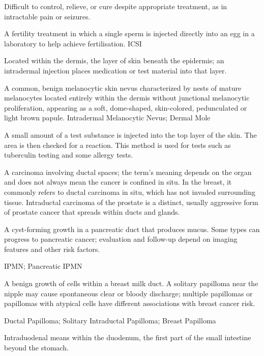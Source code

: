  Difficult to control, relieve, or cure despite appropriate treatment, as in intractable pain or seizures.

 A fertility treatment in which a single sperm is injected directly into an egg in a laboratory to help achieve fertilisation.
\synonyms
ICSI

 Located within the dermis, the layer of skin beneath the epidermis; an intradermal injection places medication or test material into that layer.

 A common, benign melanocytic skin nevus characterized by nests of mature melanocytes located entirely within the dermis without junctional melanocytic proliferation, appearing as a soft, dome-shaped, skin-colored, pedunculated or light brown papule.
\synonyms
Intradermal Melanocytic Nevus; Dermal Mole

 A small amount of a test substance is injected into the top layer of the skin. The area is then checked for a reaction. This method is used for tests such as tuberculin testing and some allergy tests.

 A carcinoma involving ductal spaces; the term’s meaning depends on the organ and does not always mean the cancer is confined in situ. In the breast, it commonly refers to ductal carcinoma in situ, which has not invaded surrounding tissue. Intraductal carcinoma of the prostate is a distinct, usually aggressive form of prostate cancer that spreads within ducts and glands.

 A cyst-forming growth in a pancreatic duct that produces mucus. Some types can progress to pancreatic cancer; evaluation and follow-up depend on imaging features and other risk factors.

\synonyms
IPMN; Pancreatic IPMN

 A benign growth of cells within a breast milk duct. A solitary papilloma near the nipple may cause spontaneous clear or bloody discharge; multiple papillomas or papillomas with atypical cells have different associations with breast cancer risk.

\synonyms
Ductal Papilloma; Solitary Intraductal Papilloma; Breast Papilloma

 Intraduodenal means within the duodenum, the first part of the small intestine beyond the stomach.

